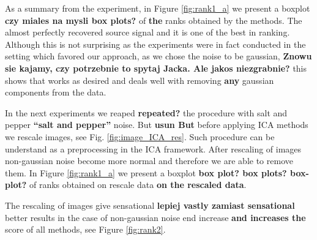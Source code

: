 As a summary from the experiment, in Figure \ref{fig:rank1_a} we present a boxplot \textbf{czy miales na mysli box plots?} of \textbf{the} ranks obtained by the methods.
The \ICA {} almost perfectly recovered source signal and it is one of the best in ranking. 
Although this is not surprising as the experiments were in fact conducted in the setting which favored our approach, as we chose the noise to be gaussian, \textbf{Znowu sie kajamy, czy potrzebnie to spytaj Jacka. Ale jakos niezgrabnie?} this shows that \ICA{} works as desired and deals well with removing \textbf{any} gaussian components from the data. 

In the next experiments we reaped \textbf{repeated?} the procedure with salt and pepper \textbf{``salt and pepper''} noise. But \textbf{usun But} before applying ICA methods we rescale images, see Fig. \ref{fig:image_ICA_res}. 
Such procedure can be understand as a preprocessing in the ICA framework. After rescaling of images non-gaussian noise become more normal and therefore we are able to remove them. In Figure \ref{fig:rank1_a} we present a boxplot \textbf{box plot? box plots? box-plot?} of ranks obtained on rescale data \textbf{on the rescaled data}. 

The rescaling of images give sensational \textbf{lepiej vastly zamiast sensational} better results in the case of non-gaussian noise end increase \textbf{and increases the} score of all methods, see Figure \ref{fig:rank2}. 


